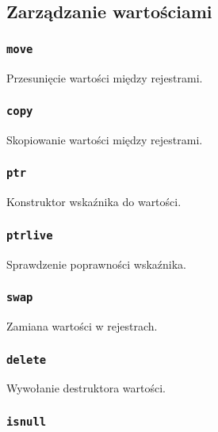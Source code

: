 \subsection{Zarządzanie wartościami}
\label{viua_vm_ops_value_management}

\subsubsection{\texttt{move}}

Przesunięcie wartości między rejestrami.

\subsubsection{\texttt{copy}}

Skopiowanie wartości między rejestrami.

\subsubsection{\texttt{ptr}}

Konstruktor wskaźnika do wartości.

\subsubsection{\texttt{ptrlive}}

Sprawdzenie poprawności wskaźnika.

\subsubsection{\texttt{swap}}

Zamiana wartości w rejestrach.

\subsubsection{\texttt{delete}}

Wywołanie destruktora wartości.

\subsubsection{\texttt{isnull}}
